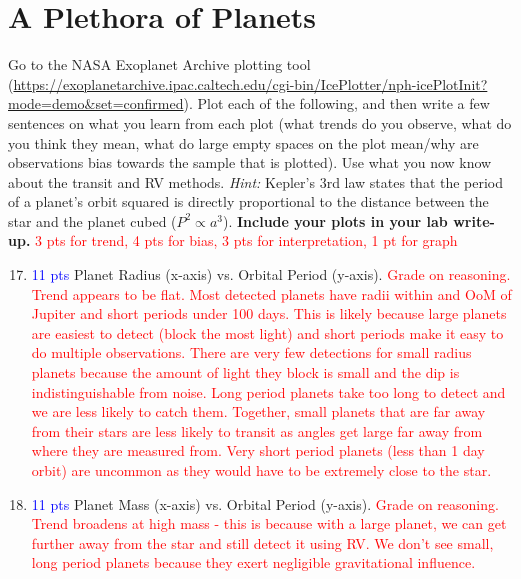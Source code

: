 \documentclass[11pt]{article}
\begin{document}
\section{A Plethora of Planets}
Go to the NASA Exoplanet Archive plotting tool (\url{https://exoplanetarchive.ipac.caltech.edu/cgi-bin/IcePlotter/nph-icePlotInit?mode=demo&set=confirmed}).  Plot each of the following, and then write a few sentences on what you learn from each plot (what trends do you observe, what do you think they mean, what do large empty spaces on the plot mean/why are observations bias towards the sample that is plotted).  Use what you now know about the transit and RV methods. \textit{Hint:} Kepler's 3rd law states that the period of a planet's orbit squared is directly proportional to the distance between the star and the planet cubed ($P^2 \propto a^3$). \textbf{Include your plots in your lab write-up.}  \textcolor{red}{3 pts for trend, 4 pts for bias, 3 pts for interpretation, 1 pt for graph}
    \begin{enumerate}
    \setcounter{enumi}{16}
        \item \textcolor{blue}{11 pts} Planet Radius (x-axis) vs. Orbital Period (y-axis). \textcolor{red}{Grade on reasoning. Trend appears to be flat.  Most detected planets have radii within and OoM of Jupiter and short periods under 100 days.  This is likely because large planets are easiest to detect (block the most light) and short periods make it easy to do multiple observations. There are very few detections for small radius planets because the amount of light they block is small and the dip is indistinguishable from noise. Long period planets take too long to detect and we are less likely to catch them. Together, small planets that are far away from their stars are less likely to transit as angles get large far away from where they are measured from.  Very short period planets (less than 1 day orbit) are uncommon as they would have to be extremely close to the star.}
        \item \textcolor{blue}{11 pts} Planet Mass (x-axis) vs. Orbital Period (y-axis).  \textcolor{red}{Grade on reasoning.  Trend broadens at high mass - this is because with a large planet, we can get further away from the star and still detect it using RV.  We don't see small, long period planets because they exert negligible gravitational influence.}

    \end{enumerate}


\end{document}
